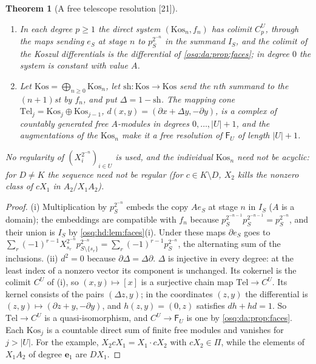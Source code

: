 \documentclass[11pt,letterpaper]{article}
\numberwithin{equation}{section}
\newtheorem{theorem}{Theorem}[section]
\theoremstyle{definition}
\theoremstyle{remark}
\theoremstyle{plain}
\newcommand{\src}[1]{\textup{\textsf{[#1]}}}
\begin{document}
\begin{theorem}[A free telescope resolution \src{21}]\label{osq:da:thm:telescope}
\leavevmode
\begin{enumerate}
\item In each degree $p\ge1$ the direct system $(\mathrm{Kos}_n,f_n)$ has colimit $C^U_p$, through the maps sending $e_S$ at stage $n$ to
$p_S^{2^{-n}}$ in the summand $I_S$, and the colimit of the Koszul differentials is the differential of \cref{osq:da:prop:faces}; in
degree $0$ the system is constant with value $A$.
\item Let $\mathrm{Kos}=\bigoplus_{n\ge0}\mathrm{Kos}_n$, let $\mathrm{sh}:\mathrm{Kos}\to\mathrm{Kos}$ send the $n$th summand to the
$(n+1)$st by $f_n$, and put $\Delta=1-\mathrm{sh}$. The mapping cone $\mathrm{Tel}_j=\mathrm{Kos}_j\oplus\mathrm{Kos}_{j-1}$,
$d(x,y)=(\partial x+\Delta y,-\partial y)$, is a complex of countably generated free $A$-modules in degrees $0,\dots,|U|+1$, and the
augmentations of the $\mathrm{Kos}_n$ make it a free resolution of $\mathsf F_U$ of length $|U|+1$.
\end{enumerate}
No regularity of $(X_i^{2^{-n}})_{i\in U}$ is used, and the individual $\mathrm{Kos}_n$ need not be acyclic: for $D\ne K$ the sequence need
not be regular (for $c\in K\setminus D$, $X_2$ kills the nonzero class of $cX_1$ in $A_2/X_1A_2$).
\end{theorem}
\begin{proof}
(i) Multiplication by $p_S^{2^{-n}}$ embeds the copy $Ae_S$ at stage $n$ in $I_S$ ($A$ is a domain); the embeddings are compatible with
$f_n$ because $p_S^{2^{-n-1}}p_S^{2^{-n-1}}=p_S^{2^{-n}}$, and their union is $I_S$ by \cref{osq:hd:lem:faces}(i). Under these maps
$\partial e_S$ goes to $\sum_r(-1)^{r-1}X_{s_r}^{2^{-n}}p_{S\setminus\{s_r\}}^{2^{-n}}=\sum_r(-1)^{r-1}p_S^{2^{-n}}$, the alternating sum
of the inclusions. (ii) $d^2=0$ because $\partial\Delta=\Delta\partial$. $\Delta$ is injective in every degree: at the least index of a
nonzero vector its component is unchanged. Its cokernel is the colimit $C^U$ of (i), so $(x,y)\mapsto[x]$ is a surjective chain map
$\mathrm{Tel}\to C^U$. Its kernel consists of the pairs $(\Delta z,y)$; in the coordinates $(z,y)$ the differential is
$(z,y)\mapsto(\partial z+y,-\partial y)$, and $h(z,y)=(0,z)$ satisfies $dh+hd=1$. So $\mathrm{Tel}\to C^U$ is a quasi-isomorphism, and
$C^U\to\mathsf F_U$ is one by \cref{osq:da:prop:faces}. Each $\mathrm{Kos}_j$ is a countable direct sum of finite free modules and
vanishes for $j>|U|$. For the example, $X_2cX_1=X_1\cdot cX_2$ with $cX_2\in\Pi$, while the elements of $X_1A_2$ of degree $\mathbf e_1$ are
$DX_1$.
\end{proof}
\end{document}
